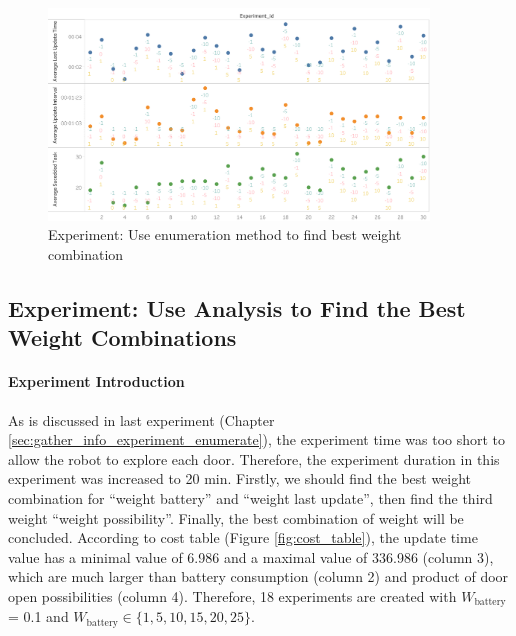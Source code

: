 \begin{figure}[htbp]
    \centering
    \includegraphics[width = 0.9\textwidth]{content/images/ch5/gather_info_enumerate.png}
    \caption{Experiment: Use enumeration method to find best weight combination}
    \label{fig:gather_info_experiment_enumerate}
\end{figure}


\subsection{Experiment: Use Analysis to Find the Best Weight Combinations}

\paragraph{Experiment Introduction} 
As is discussed in last experiment (Chapter \ref{sec:gather_info_experiment_enumerate}), the experiment time was too short to allow the robot to explore each door. Therefore, the experiment duration in this experiment was increased to 20 min.
Firstly, we should find the best weight combination for ``weight battery'' and ``weight last update'', then find the third weight ``weight possibility''. Finally, the best combination of weight will be concluded.
 According to cost table (Figure \ref{fig:cost_table}), the update time value has a minimal value of 6.986 and a maximal value of 336.986 (column 3), which are much larger than battery consumption (column 2) and product of door open possibilities (column 4).
  Therefore, 18 experiments are created with $W_{\mbox{battery}}$
   = 0.1  and $W_{\mbox{battery}} \in \{1,5,10,15,20,25 \}$.

